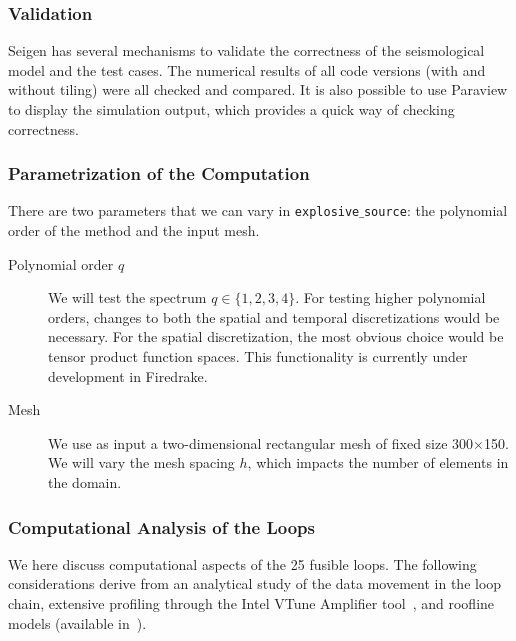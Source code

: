 \subsubsection{Validation}
Seigen has several mechanisms to validate the correctness of the seismological model and the test cases. The numerical results of all code versions (with and without tiling) were all checked and compared. It is also possible to use Paraview to display the simulation output, which provides a quick way of checking correctness.

\subsubsection{Parametrization of the Computation}
There are two parameters that we can vary in {\tt explosive$\_$source}: the polynomial order of the method and the input mesh. 

\begin{description}
\item[Polynomial order $q$] We will test the spectrum $q \in \lbrace 1, 2, 3, 4 \rbrace$. For testing higher polynomial orders, changes to both the spatial and temporal discretizations would be necessary. For the spatial discretization, the most obvious choice would be tensor product function spaces. This functionality is currently under development in Firedrake.
\item[Mesh] We use as input a two-dimensional rectangular mesh of fixed size 300$\times$150. We will vary the mesh spacing $h$, which impacts the number of elements in the domain.
\end{description}

\subsubsection{Computational Analysis of the Loops}
We here discuss computational aspects of the 25 fusible loops. The following considerations derive from an analytical study of the data movement in the loop chain, extensive profiling through the Intel VTune Amplifier tool~\citep{vtune}, and roofline models (available in~\cite{Seigen-paper}).

